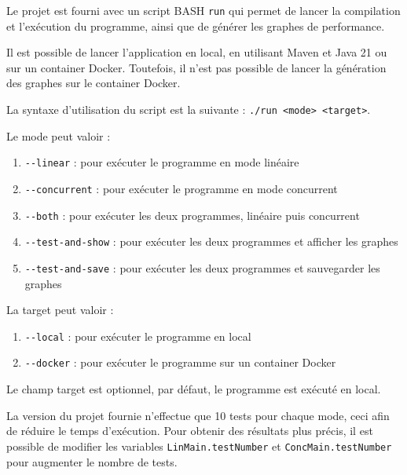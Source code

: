 \documentclass[
  french,
  a4paper,
]{scrartcl}
\begin{document}
Le projet est fourni avec un script BASH \lstinline|run| qui permet de lancer 
la compilation et l'exécution du programme, ainsi que de générer 
les graphes de performance.

Il est possible de lancer l'application en local, en utilisant Maven et Java 21 
ou sur un container Docker. Toutefois, il n'est pas possible de lancer 
la génération des graphes sur le container Docker. 

La syntaxe d'utilisation du script est la suivante : \lstinline|./run <mode> <target>|. 

Le mode peut valoir : 

\begin{enumerate}
  \item \lstinline|--linear| : pour exécuter le programme en mode linéaire
  \item \lstinline|--concurrent|  : pour exécuter le programme en mode concurrent
  \item \lstinline|--both|  : pour exécuter les deux programmes, linéaire puis concurrent
  \item \lstinline|--test-and-show| : pour exécuter les deux programmes et afficher les graphes
  \item \lstinline|--test-and-save| : pour exécuter les deux programmes et sauvegarder les graphes
\end{enumerate}

La target peut valoir :
  \begin{enumerate}
    \item \lstinline|--local| : pour exécuter le programme en local
    \item \lstinline|--docker| : pour exécuter le programme sur un container Docker
  \end{enumerate}

  Le champ target est optionnel, par défaut, le programme est exécuté en local.
  
  La version du projet fournie n'effectue que 10 tests pour chaque mode, ceci 
  afin de réduire le temps d'exécution. Pour obtenir des résultats plus précis,
  il est possible de modifier les variables \lstinline|LinMain.testNumber| et \lstinline|ConcMain.testNumber| 
  pour augmenter le nombre de tests.
  
  \clearpage
  \listoffigures
  \listoftables
  
\end{document}
